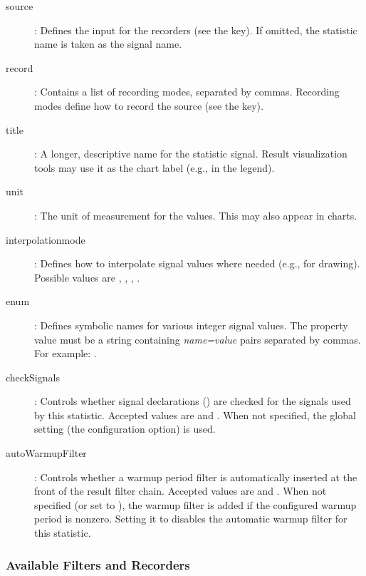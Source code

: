 \begin{description}
  \item[source]: Defines the input for the recorders (see the  key).
     If omitted, the statistic name is taken as the signal name.
  \item[record]: Contains a list of recording modes, separated by commas.
     Recording modes define how to record the source (see the  key).
  \item[title]: A longer, descriptive name for the statistic signal. Result
      visualization tools may use it as the chart label (e.g., in the legend).
  \item[unit]: The unit of measurement for the values. This may also appear in charts.
  \item[interpolationmode]: Defines how to interpolate signal values where
      needed (e.g., for drawing). Possible values are ,
      , , .
  \item[enum]: Defines symbolic names for various integer signal values.
      The property value must be a string containing \textit{name=value} pairs
      separated by commas. For example: .
  \item[checkSignals]: Controls whether signal declarations ()
      are checked for the signals used by this statistic. Accepted values are
       and . When not specified, the global setting
      (the  configuration option) is used.
  \item[autoWarmupFilter]: Controls whether a warmup period filter is
      automatically inserted at the front of the result filter chain.
      Accepted values are  and . When not specified
      (or set to ), the warmup filter is added if the configured
      warmup period is nonzero. Setting it to  disables the
      automatic warmup filter for this statistic.
\end{description}


\subsubsection{Available Filters and Recorders}
\label{sec:simple-modules:available-result-filters-and-recorders}


